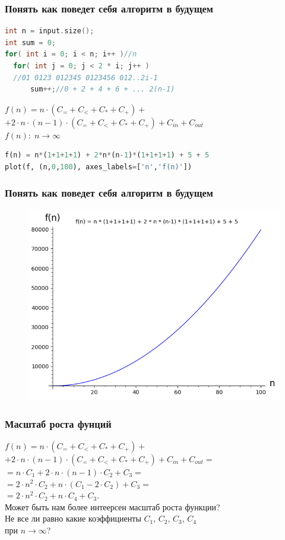 \documentclass[russian, 12pt]{beamer}
\begin{document}
\begin{frame}[fragile]
\frametitle{Понять как поведет себя алгоритм в будущем}
\begin{lstlisting}[language=C++]
int n = input.size();
int sum = 0;
for( int i = 0; i < n; i++ )//n
  for( int j = 0; j < 2 * i; j++ )
  //01 0123 012345 0123456 012..2i-1
      sum++;//0 + 2 + 4 + 6 + ... 2(n-1)  
\end{lstlisting}
$f(n) = n \cdot (C_= + C_< + C_* + C_+) +$\\
$ + 2\cdot n\cdot (n-1) \cdot (C_= + C_< + C_* + C_+) + C_{in} + C_{out}$\\[0.2cm]
\pause
$f(n) :\; n \rightarrow \infty$
\pause
\begin{lstlisting}[language=python]
f(n) = n*(1+1+1+1) + 2*n*(n-1)*(1+1+1+1) + 5 + 5
plot(f, (n,0,100), axes_labels=['n','f(n)']) 
\end{lstlisting}
\end{frame}
\begin{frame}[fragile]
\frametitle{Понять как поведет себя алгоритм в будущем}
\begin{figure}
  \includegraphics[width=0.9\linewidth]{img/complexity_1.png}
\end{figure}
\end{frame}
\begin{frame}
\frametitle{Масштаб роста фунций}
$f(n) = n \cdot (C_= + C_< + C_* + C_+) +$\\
$ + 2\cdot n\cdot (n-1) \cdot (C_= + C_< + C_* + C_+) + C_{in} + C_{out}=$\\
\pause
$= n \cdot C_1 + 2\cdot n\cdot (n-1) \cdot C_2 + C_3=$\\
\pause
$= 2\cdot n^2 \cdot C_2 + n \cdot(C_1 -2\cdot C_2) + C_3=$\\[0.2cm]
\pause
$= 2\cdot n^2 \cdot C_2 + n \cdot C_4 + C_3.$\\[0.2cm]
\pause
Может быть нам более интеерсен масштаб роста функции?\\[0.2cm]
\pause
Не все ли равно какие коэффициенты $C_1$, $C_2$, $C_3$, $C_4$\\ 
при $n\rightarrow\infty$? 
\end{frame}
\end{document}
